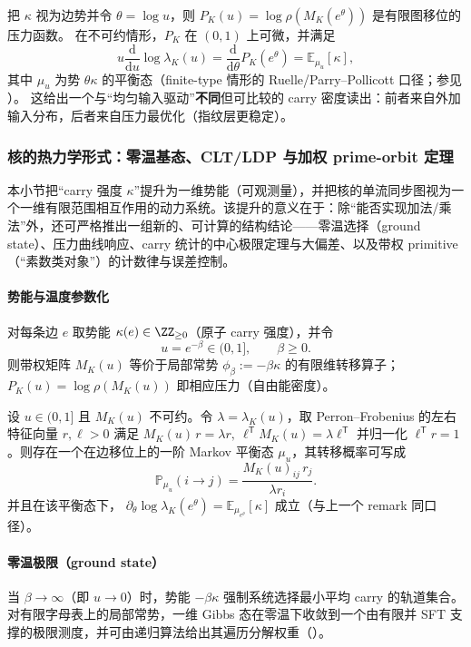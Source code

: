 \begin{remark}
把 $\kappa$ 视为边势并令 $\theta=\log u$，则 $P_K(u)=\log\rho(M_K(e^\theta))$ 是有限图移位的压力函数。
在不可约情形，$P_K$ 在 $(0,1)$ 上可微，并满足
\[
u\frac{\mathrm{d}}{\mathrm{d}u}\log\lambda_K(u)
=\frac{\mathrm{d}}{\mathrm{d}\theta}P_K(e^\theta)
=\mathbb{E}_{\mu_u}[\kappa],
\]
其中 $\mu_u$ 为势 $\theta\kappa$ 的平衡态（finite-type 情形的 Ruelle/Parry--Pollicott 口径；参见 \cite{Ruelle1978Thermodynamic,ParryPollicott1990Zeta}）。
这给出一个与“均匀输入驱动”\textbf{不同}但可比较的 carry 密度读出：前者来自外加输入分布，后者来自压力最优化（指纹层更稳定）。
\end{remark}

\subsubsection{核的热力学形式：零温基态、CLT/LDP 与加权 prime-orbit 定理}\label{subsec:kernel-thermo}
本小节把“carry 强度 $\kappa$”提升为一维势能（可观测量），并把核的单流同步图视为一个一维有限范围相互作用的动力系统。该提升的意义在于：除“能否实现加法/乘法”外，还可严格推出一组新的、可计算的结构结论——零温选择（ground state）、压力曲线响应、carry 统计的中心极限定理与大偏差、以及带权 primitive（“素数类对象”）的计数律与误差控制。

\paragraph{势能与温度参数化}
对每条边 $e$ 取势能 $\kappa(e)\in\ZZ_{\ge 0}$（原子 carry 强度），并令
\[
u=e^{-\beta}\in(0,1],\qquad \beta\ge 0.
\]
则带权矩阵 $M_K(u)$ 等价于局部常势 $\phi_\beta:=-\beta\kappa$ 的有限维转移算子；$P_K(u)=\log\rho(M_K(u))$ 即相应压力（自由能密度）。

\begin{proposition}\label{prop:kernel-equilibrium-pf}
设 $u\in(0,1]$ 且 $M_K(u)$ 不可约。令 $\lambda=\lambda_K(u)$，取 Perron--Frobenius 的左右特征向量 $r,\ell>0$ 满足
\(
M_K(u)\,r=\lambda r,\ \ell^{\mathsf T}M_K(u)=\lambda \ell^{\mathsf T}
\)
并归一化 $\ell^{\mathsf T}r=1$。则存在一个在边移位上的一阶 Markov 平衡态 $\mu_u$，其转移概率可写成
\[
\mathbb{P}_{\mu_u}(i\to j)=\frac{M_K(u)_{ij}\,r_j}{\lambda r_i}.
\]
并且在该平衡态下，
\(
\partial_\theta \log\lambda_K(e^\theta)=\mathbb{E}_{\mu_{e^\theta}}[\kappa]
\)
成立（与上一个 remark 同口径）。
\end{proposition}

\paragraph{零温极限（ground state）}
当 $\beta\to\infty$（即 $u\to 0$）时，势能 $-\beta\kappa$ 强制系统选择最小平均 carry 的轨道集合。对有限字母表上的局部常势，一维 Gibbs 态在零温下收敛到一个由有限并 SFT 支撑的极限测度，并可由递归算法给出其遍历分解权重（\cite{ChazottesGambaudoUgalde2011ZeroTempLocConst}）。


